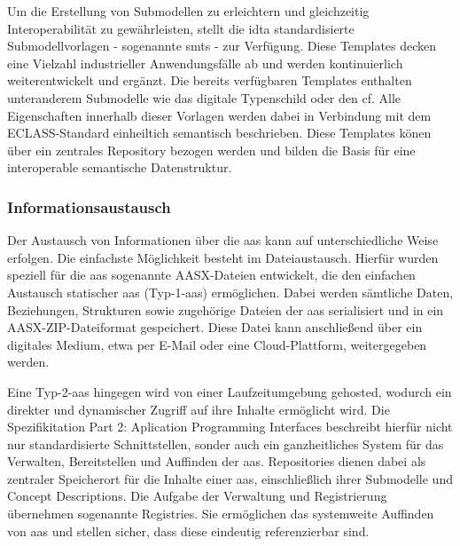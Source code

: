
Um die Erstellung von Submodellen zu erleichtern und gleichzeitig Interoperabilität zu gewährleisten, stellt die \acs{idta} standardisierte Submodellvorlagen - sogenannte \acp{smt} - zur Verfügung.
Diese Templates decken eine Vielzahl industrieller Anwendungsfälle ab und werden kontinuierlich weiterentwickelt und ergänzt.
Die bereits verfügbaren Templates enthalten unteranderem Submodelle wie das digitale Typenschild oder den \ac{cf}.
Alle Eigenschaften innerhalb dieser Vorlagen werden dabei in Verbindung mit dem ECLASS-Standard einheiltich semantisch beschrieben.
Diese Templates könen über ein zentrales Repository \cite{idtaTemplates} bezogen werden und bilden die Basis für eine interoperable semantische Datenstruktur.

\subsubsection{Informationsaustausch}
Der Austausch von Informationen über die \acs{aas} kann auf unterschiedliche Weise erfolgen.
Die einfachste Möglichkeit besteht im Dateiaustausch. Hierfür wurden speziell für die \acs{aas} sogenannte AASX-Dateien \cite{SpezifikationPart5} entwickelt, die den einfachen Austausch statischer \acs{aas} (Typ-1-\acs{aas}) ermöglichen.
Dabei werden sämtliche Daten, Beziehungen, Strukturen sowie zugehörige Dateien der \acs{aas} serialisiert und in ein AASX-ZIP-Dateiformat gespeichert. 
Diese Datei kann anschließend über ein digitales Medium, etwa per E-Mail oder eine Cloud-Plattform, weitergegeben werden. 

Eine Typ-2-\acs{aas} hingegen wird von einer Laufzeitumgebung gehosted, wodurch ein direkter und dynamischer Zugriff auf ihre Inhalte ermöglicht wird. 
Die Spezifikitation Part 2: Aplication Programming Interfaces \cite{SpezifikationPart2} beschreibt hierfür nicht nur standardisierte Schnittstellen, sonder auch ein ganzheitliches System für das Verwalten, Bereitstellen und Auffinden der \acs{aas}.
Repositories dienen dabei als zentraler Speicherort für die Inhalte einer \acs{aas}, einschließlich ihrer Submodelle und Concept Descriptions.
Die Aufgabe der Verwaltung und Registrierung übernehmen sogenannte Registries.
Sie ermöglichen das systemweite Auffinden von \acs{aas} und stellen sicher, dass diese eindeutig referenzierbar sind.

